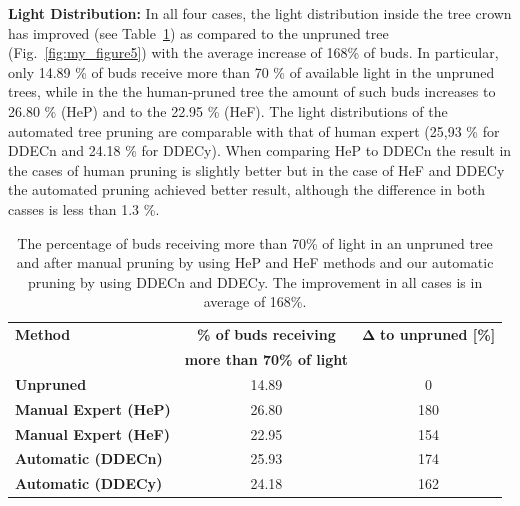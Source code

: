 \noindent\textbf{Light Distribution:} In all four cases, the light distribution inside the tree crown has
improved (see Table~\ref{tab:light}) as compared to the unpruned tree (Fig.~\ref{fig:my_figure5}) with the average increase of 168\% of buds. 
In particular, only 14.89 \% of buds receive more than 70 \% of available light in the unpruned trees, 
while in the the human-pruned tree the amount of such buds increases to 26.80 \% (HeP) and to the 22.95 \% (HeF).
The light distributions of the automated tree pruning are comparable with
that of human expert (25,93 \% for DDECn and 24.18 \% for DDECy). 
When comparing HeP to DDECn the result in the cases of human pruning is slightly better but in the case of HeF and DDECy the automated pruning achieved better result, although the difference in both casses is less than 1.3 \%.  
\begin{table}[hbt]
\caption{The percentage of buds receiving more than 70\% of light in an unpruned tree and after manual pruning by using HeP and HeF methods and our automatic pruning by using DDECn and DDECy. The improvement in all cases is in average of 168\%. }
\label{tab:light}
\begin{center}
\begin{tabular}{ |l|c|c| } 
 \hline
 \textbf{Method} & \textbf{\% of buds receiving}                           & $\mathbf{\Delta}$ \textbf{to unpruned [\%]} \\ 
                 &  \textbf{more than 70\% of light}                       &  \\ 
 \hline
 \textbf{Unpruned}            & 14.89 & 0 \\ 
 \hline
 \textbf{Manual Expert (HeP)} & 26.80 & 180 \\ 
 \textbf{Manual Expert (HeF)} & 22.95 & 154 \\ 
  \hline
 \textbf{Automatic (DDECn)} & 25.93 & 174 \\ 
 \textbf{Automatic (DDECy)} & 24.18 & 162 \\ 
 \hline
\end{tabular}
\end{center}

\end{table}

